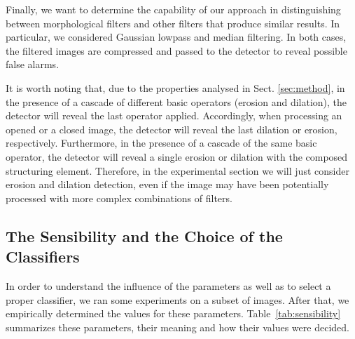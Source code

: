\documentclass[review]{elsarticle}
\begin{document}
Finally, we want to determine the capability of our approach in distinguishing between morphological filters and other filters that produce similar results. In particular, we considered Gaussian lowpass and median filtering. In both cases, the filtered images are compressed and passed to the detector to reveal possible false alarms.

It is worth noting that, due to the properties analysed in Sect. \ref{sec:method}, in the presence of a cascade of different basic operators (erosion and dilation), the detector will reveal the last operator applied. Accordingly, when processing an opened or a closed image, the detector will reveal the last dilation or erosion, respectively. Furthermore, in the presence of a cascade of the same basic operator, the detector will reveal a single erosion or dilation with the composed structuring element. Therefore, in the experimental section we will just consider erosion and dilation detection, even if the image may have been potentially processed with more complex combinations of filters.

\subsection{The Sensibility and the Choice of the Classifiers}

In order to understand the influence of the parameters as well as to select a proper classifier, we ran some experiments on a subset of images. After that, we empirically determined the values for these parameters. Table~\ref{tab:sensibility} summarizes these parameters, their meaning and how their values were decided.
\end{document}
